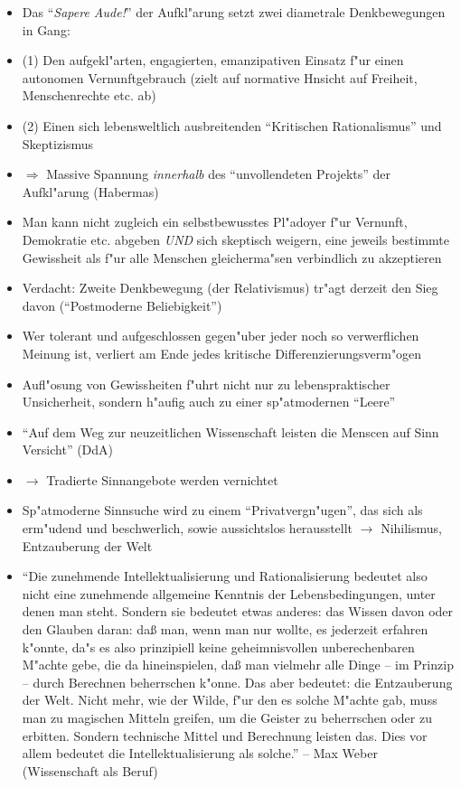 \documentclass[emulatestandardclasses]{scrartcl}
\begin{document}
\begin{itemize}
  \item Das "`\emph{Sapere Aude!}"' der Aufkl"arung setzt zwei diametrale Denkbewegungen in Gang:
  \item (1) Den aufgekl"arten, engagierten, emanzipativen Einsatz f"ur einen autonomen Vernunftgebrauch (zielt auf normative Hnsicht auf Freiheit, Menschenrechte etc. ab)
  \item (2) Einen sich lebensweltlich ausbreitenden "`Kritischen Rationalismus"' und Skeptizismus
  \item $\Rightarrow$ Massive Spannung \emph{innerhalb} des "`unvollendeten Projekts"' der Aufkl"arung (Habermas)
  \item Man kann nicht zugleich ein selbstbewusstes Pl"adoyer f"ur Vernunft, Demokratie etc. abgeben \emph{UND} sich skeptisch weigern, eine jeweils bestimmte Gewissheit als f"ur alle Menschen gleicherma"sen verbindlich zu akzeptieren
  \item Verdacht: Zweite Denkbewegung (der Relativismus) tr"agt derzeit den Sieg davon ("`Postmoderne Beliebigkeit"')
  \item Wer tolerant und aufgeschlossen gegen"uber jeder noch so verwerflichen Meinung ist, verliert am Ende jedes kritische Differenzierungsverm"ogen
  \item Aufl"osung von Gewissheiten f"uhrt nicht nur zu lebenspraktischer Unsicherheit, sondern h"aufig auch zu einer sp"atmodernen "`Leere"'
  \item "`Auf dem Weg zur neuzeitlichen Wissenschaft leisten die Menscen auf Sinn Versicht"' (DdA)
  \item $\rightarrow$ Tradierte Sinnangebote werden vernichtet
  \item Sp"atmoderne Sinnsuche wird zu einem "`Privatvergn"ugen"', das sich als erm"udend und beschwerlich, sowie aussichtslos herausstellt $\rightarrow$ Nihilismus, Entzauberung der Welt
  \item "`Die zunehmende Intellektualisierung und Rationalisierung bedeutet also nicht eine zunehmende allgemeine Kenntnis der Lebensbedingungen, unter denen man steht. Sondern sie bedeutet etwas anderes: das Wissen davon oder den Glauben daran: daß man, wenn man nur wollte, es jederzeit erfahren k"onnte, da"s es also prinzipiell keine geheimnisvollen unberechenbaren M"achte gebe, die da hineinspielen, daß man vielmehr alle Dinge – im Prinzip – durch Berechnen beherrschen k"onne. Das aber bedeutet: die Entzauberung der Welt. Nicht mehr, wie der Wilde, f"ur den es solche M"achte gab, muss man zu magischen Mitteln greifen, um die Geister zu beherrschen oder zu erbitten. Sondern technische Mittel und Berechnung leisten das. Dies vor allem bedeutet die Intellektualisierung als solche."' -- Max Weber (Wissenschaft als Beruf)

\end{itemize}
\end{document}
